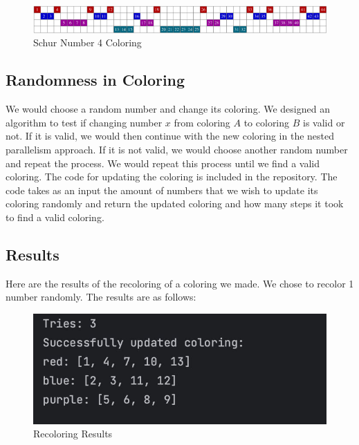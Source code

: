 \documentclass[12pt]{article}
\begin{document}
\vspace{1cm} %

\begin{figure}[h!]
    \centering
    \includegraphics[width=\textwidth]{schur_four.png}
    \caption{Schur Number 4 Coloring}
    \label{fig:schur4}
\end{figure}

\subsection{Randomness in Coloring}
We would choose a random number and change its coloring. We designed an algorithm to test if changing number $x$ from coloring $A$ to coloring $B$ is valid or not. If it is valid, we would then continue with the new coloring in the nested parallelism approach. If it is not valid, we would choose another random number and repeat the process. We would repeat this process until we find a valid coloring.
The code for updating the coloring is included in the repository. The code takes as an input the amount of numbers that we wish to update its coloring randomly and return the updated coloring and how many steps it took to find a valid coloring.

\subsection{Results}
Here are the results of the recoloring of a coloring we made. We chose to recolor 1 number randomly. The results are as follows:

\begin{figure}
    \centering
    \includegraphics[width=\textwidth]{recoloring_results.jpeg}
    \caption{Recoloring Results}
    \label{fig:recoloring}
\end{figure}
    
\end{document}
